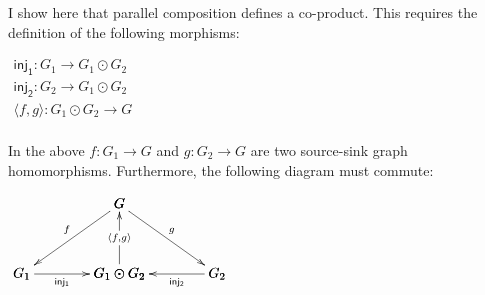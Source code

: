 I show here that parallel composition defines a co-product.  This
requires the definition of the following morphisms:
\begin{center}
  \begin{math}
    \begin{array}{lll}
      \mathsf{inj_1} : G_1 \to G_1 \odot G_2\\
      \mathsf{inj_2} : G_2 \to G_1 \odot G_2\\
      \langle f , g \rangle : G_1 \odot G_2 \to G\\
    \end{array}
  \end{math}
\end{center}
In the above $f : G_1 \to G$ and $g : G_2 \to G$ are two source-sink
graph homomorphisms.  Furthermore, the following diagram must commute:
\begin{center}
  \begin{math}
    \bfig
    \Atrianglepair/->`<-`->`->`<-/<700,500>[G`G_1`G_1 \odot G_2`G_2;f`\langle f , g \rangle`g`\mathsf{inj_1}`\mathsf{inj_2}]
    \efig
  \end{math}
\end{center}

